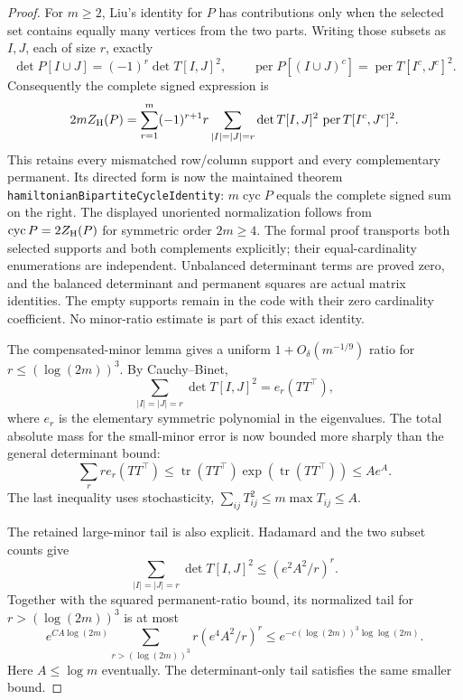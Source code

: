\begin{proof}
For \(m\geq2\), Liu's identity for \(P\) has contributions
only when the selected set contains equally many vertices
from the two parts.
Writing those subsets as \(I,J\), each of size \(r\), exactly
\[
 \det P[I\cup J]=(-1)^r\det T[I,J]^2,\qquad
 \operatorname{per}P[(I\cup J)^c]
                         =\operatorname{per}T[I^c,J^c]^2.
\]
Consequently the complete signed expression is
\[
 2m Z_{\rm H}(P)
 =\sum_{r=1}^m(-1)^{r+1}r
     \sum_{\substack{|I|=|J|=r}}
       \det T[I,J]^2\,\operatorname{per}T[I^c,J^c]^2.
\]
This retains every mismatched row/column support and every
complementary permanent.
Its directed form is now the maintained theorem
\texttt{hamiltonianBipartiteCycleIdentity}:
\(m\operatorname{cyc}P\) equals the complete signed sum on the right.
The displayed unoriented normalization follows from
\(\operatorname{cyc}P=2Z_{\rm H}(P)\) for symmetric order \(2m\geq4\).
The formal proof transports both selected supports and both complements
explicitly; their equal-cardinality enumerations are independent.
Unbalanced determinant terms are proved zero, and the balanced
determinant and permanent squares are actual matrix identities.
The empty supports remain in the code with their zero cardinality
coefficient. No minor-ratio estimate is part of this exact identity.

The compensated-minor lemma gives a uniform
\(1+O_\delta(m^{-1/9})\) ratio for \(r\leq(\log(2m))^3\).
By Cauchy--Binet,
\[
 \sum_{|I|=|J|=r}\det T[I,J]^2=e_r(TT^\top),
\]
where \(e_r\) is the elementary symmetric polynomial in the
eigenvalues.
The total absolute mass for the small-minor error is now
bounded more sharply than the general determinant bound:
\[
 \sum_r r e_r(TT^\top)
 \leq\operatorname{tr}(TT^\top)\exp(\operatorname{tr}(TT^\top))
 \leq A e^A.
\]
The last inequality uses stochasticity,
\(\sum_{ij}T_{ij}^2\leq m\max T_{ij}\leq A\).

The retained large-minor tail is also explicit.
Hadamard and the two subset counts give
\[
 \sum_{|I|=|J|=r}\det T[I,J]^2
          \leq(e^2A^2/r)^r .
\]
Together with the squared permanent-ratio bound, its normalized
tail for \(r>(\log(2m))^3\) is at most
\[
 e^{C A\log(2m)}
       \sum_{r>(\log(2m))^3}r(e^4A^2/r)^r
          \leq e^{-c(\log(2m))^3\log\log(2m)} .
\]
Here \(A\leq\log m\) eventually.
The determinant-only tail satisfies the same smaller bound.


\end{proof}
